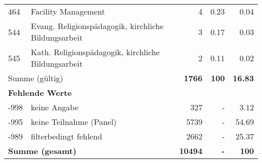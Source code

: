 \begin{longtable}{lXrrr}
        464 & \multicolumn{1}{X}{Facility Management} & %
          \num{4} &
          \num[round-mode=places,round-precision=2]{0.23} &
          \num[round-mode=places,round-precision=2]{0.04} \\

        544 & \multicolumn{1}{X}{Evang. Religionspädagogik, kirchliche Bildungsarbeit} & %
          \num{3} &
          \num[round-mode=places,round-precision=2]{0.17} &
          \num[round-mode=places,round-precision=2]{0.03} \\

        545 & \multicolumn{1}{X}{Kath. Religionspädagogik, kirchliche Bildungsarbeit} & %
          \num{2} &
          \num[round-mode=places,round-precision=2]{0.11} &
          \num[round-mode=places,round-precision=2]{0.02} \\

     \midrule
     \multicolumn{2}{l}{Summe (gültig)} &
       \textbf{\num{1766}} &
     \textbf{\num{100}} &
       \textbf{\num[round-mode=places,round-precision=2]{16.83}} \\
     \multicolumn{5}{l}{\textbf{Fehlende Werte}}\\
       -998 &
       keine Angabe &
         \num{327} &
        - &
         \num[round-mode=places,round-precision=2]{3.12} \\
       -995 &
       keine Teilnahme (Panel) &
         \num{5739} &
        - &
         \num[round-mode=places,round-precision=2]{54.69} \\
       -989 &
       filterbedingt fehlend &
         \num{2662} &
        - &
         \num[round-mode=places,round-precision=2]{25.37} \\
     \midrule
     \multicolumn{2}{l}{\textbf{Summe (gesamt)}} &
          \textbf{\num{10494}} &
        \textbf{-} &
        \textbf{\num{100}} \\
     \bottomrule
     \end{longtable}
     
